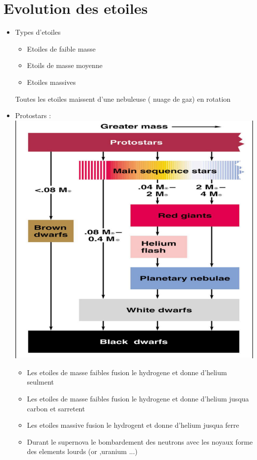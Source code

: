 \documentclass[12pt]{book}
\begin{document}
    \chapter{Evolution des etoiles }
      \begin{itemize}
        \item   Types d'etoiles \\
        \begin{itemize}
            \item Etoiles de faible masse 
            \item Etoils de masse moyenne 
            \item Etoiles massives
        \end{itemize}
        Toutes les etoiles maissent d'une nebuleuse ( nuage de gaz) en rotation \\
        \item Protostars : \\
        \includegraphics[width=0.7\linewidth]{pic/protostars.png} \\
        \begin{itemize}
            \item Les etoiles de masse faibles fusion le hydrogene et donne d'helium seulment 
            \item Les etoiles de masse faibles fusion le hydrogene et donne d'helium jusqua carbon et sarretent
            \item Les etoiles massive fusion le hydrogent et donne d'helium jusqua ferre
            \item Durant le supernova le bombardement des neutrons avec les noyaux forme des elements lourds (or ,uranium ...)

\end{itemize}
\end{itemize}
\end{document}
